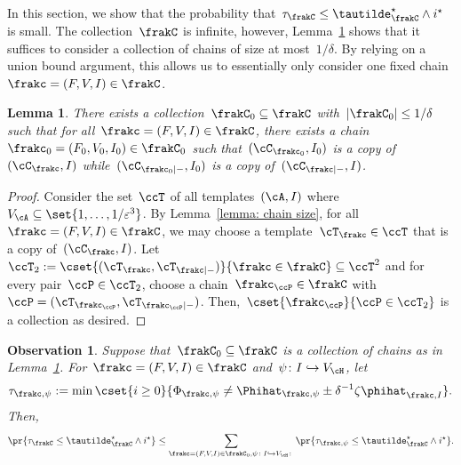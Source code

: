 \documentclass[11pt]{amsart}
\newcommand{\eps}{\varepsilon}
\DeclarePairedDelimiter{\abs}{\lvert}{\rvert}
\newcommand{\injection}{\hookrightarrow}
\newcommand{\om}{\mathord{-}}
\newtheorem{lemma}[algocf]{Lemma}
\newtheorem{observation}[algocf]{Observation}
\theoremstyle{definition}
\numberwithin{equation}{section}
\begin{document}
	In this section, we show that the probability that~$\tau_\frakC\leq \tautilde_\frakC^\star\wedge i^\star$ is small.
	The collection~$\frakC$ is infinite, however, Lemma~\ref{lemma: finite chain collection} shows that it suffices to consider a collection of chains of size at most~$1/\delta$.
	By relying on a union bound argument, this allows us to essentially only consider one fixed chain~$\frakc=(F,V,I)\in\frakC$.
	\begin{lemma}\label{lemma: finite chain collection}
		There exists a collection~$\frakC_0\subseteq\frakC$ with~$\abs{\frakC_0}\leq 1/\delta$ such that for all~$\frakc=(F,V,I)\in\frakC$, there exists a chain~$\frakc_0=(F_0,V_0,I_0)\in\frakC_0$ such that~$(\cC_{\frakc_0},I_0)$ is a copy of~$(\cC_\frakc,I)$ while~$(\cC_{\frakc_0|\om},I_0)$ is a copy of~$(\cC_{\frakc|\om},I)$.
	\end{lemma}
	\begin{proof}
		Consider the set~$\ccT$ of all templates~$(\cA,I)$ where~$V_\cA\subseteq\set{1,\ldots,1/\eps^3}$.
		By Lemma~\ref{lemma: chain size}, for all~$\frakc=(F,V,I)\in\frakC$, we may choose a template~$\cT_\frakc\in\ccT$ that is a copy of~$(\cC_\frakc,I)$.
		Let~$\ccT_2:=\cset{ (\cT_\frakc,\cT_{\frakc|\om}) }{ \frakc\in\frakC }\subseteq \ccT^2$ and for every pair~$\ccP\in\ccT_2$, choose a chain~$\frakc_\ccP\in\frakC$ with~$\ccP=(\cT_{\frakc_\ccP},\cT_{\frakc_\ccP|\om})$.
		Then,~$\cset{ \frakc_\ccP }{ \ccP\in\ccT_2 }$ is a collection as desired.
	\end{proof}
	\begin{observation}\label{observation: ladder individual}
		Suppose that~$\frakC_0\subseteq\frakC$ is a collection of chains as in Lemma~\ref{lemma: finite chain collection}.
		For~$\frakc=(F,V,I)\in\frakC$ and~$\psi\colon I\injection V_\cH$, let
		\begin{equation*}
			\tau_{\frakc,\psi}:=\min\cset{ i\geq 0 }{ \Phi_{\frakc,\psi}\neq \Phihat_{\frakc,\psi}\pm \delta^{-1}\zeta\phihat_{\frakc,I} }.
		\end{equation*}
		Then,
		\begin{equation*}
			\pr{\tau_\frakC\leq \tautilde^\star_\frakC\wedge i^\star }
			\leq \sum_{\frakc=(F,V,I)\in\frakC_0,\psi\colon I\injection V_\cH\colon} \pr{ \tau_{\frakc,\psi}\leq \tautilde^\star_\frakC\wedge i^\star }.
		\end{equation*}
	\end{observation}
	
\end{document}
